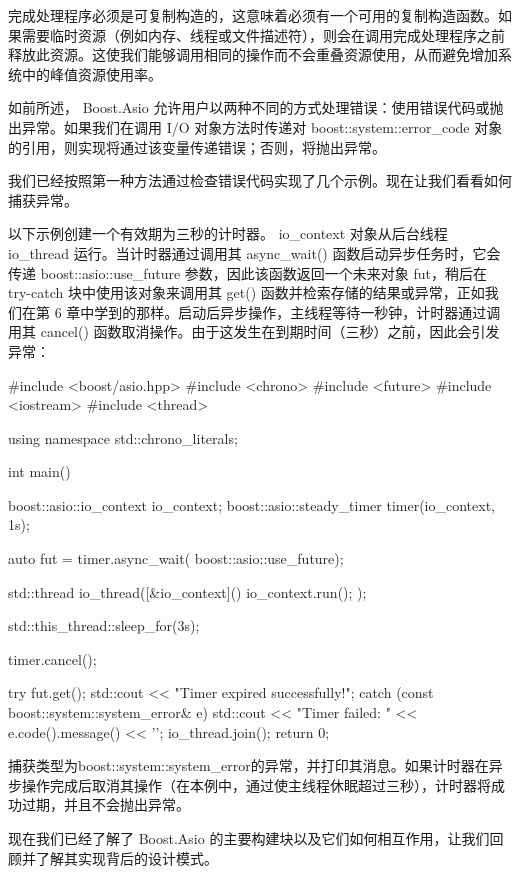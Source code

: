 完成处理程序必须是可复制构造的，这意味着必须有一个可用的复制构造函数。如果需要临时资源（例如内存、线程或文件描述符），则会在调用完成处理程序之前释放此资源。这使我们能够调用相同的操作而不会重叠资源使用，从而避免增加系统中的峰值资源使用率。


如前所述， Boost.Asio 允许用户以两种不同的方式处理错误：使用错误代码或抛出异常。如果我们在调用 I/O 对象方法时传递对 boost::system::error\_code 对象的引用，则实现将通过该变量传递错误；否则，将抛出异常。

我们已经按照第一种方法通过检查错误代码实现了几个示例。现在让我们看看如何捕获异常。

以下示例创建一个有效期为三秒的计时器。 io\_context 对象从后台线程 io\_thread 运行。当计时器通过调用其 async\_wait() 函数启动异步任务时，它会传递 boost::asio::use\_future 参数，因此该函数返回一个未来对象 fut，稍后在 try-catch 块中使用该对象来调用其 get() 函数并检索存储的结果或异常，正如我们在第 6 章中学到的那样。启动后异步操作，主线程等待一秒钟，计时器通过调用其 cancel() 函数取消操作。由于这发生在到期时间（三秒）之前，因此会引发异常：

\begin{cpp}
#include <boost/asio.hpp>
#include <chrono>
#include <future>
#include <iostream>
#include <thread>

using namespace std::chrono_literals;

int main() {
    boost::asio::io_context io_context;
    boost::asio::steady_timer timer(io_context, 1s);

    auto fut = timer.async_wait(
                        boost::asio::use_future);

    std::thread io_thread([&io_context]() {
                        io_context.run();
    });

    std::this_thread::sleep_for(3s);

    timer.cancel();

    try {
        fut.get();
        std::cout << "Timer expired successfully!\n";
    } catch (const boost::system::system_error& e) {
        std::cout << "Timer failed: "
                  << e.code().message() << '\n';
    }
    io_thread.join();
    return 0;
}
\end{cpp}

捕获类型为boost::system::system\_error的异常，并打印其消息。如果计时器在异步操作完成后取消其操作（在本例中，通过使主线程休眠超过三秒），计时器将成功过期，并且不会抛出异常。

现在我们已经了解了 Boost.Asio 的主要构建块以及它们如何相互作用，让我们回顾并了解其实现背后的设计模式。







